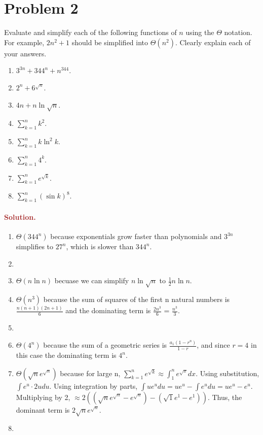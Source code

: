 \section*{Problem 2}
Evaluate and simplify each of the following functions of $n$ using the $\Theta$ notation. For example, $2n^2 + 1$ should be simplified into $\Theta(n^2)$. Clearly explain each of your answers.
\begin{enumerate}
    \item $3^{3n} + 344^n + n^{344}$.
    \item $2^{n} + 6^{\sqrt{n}}$.
    \item $4n + n \ln \sqrt{n}$.
    \item $\sum_{k = 1}^{n} k^2$.
    \item $\sum_{k = 1}^{n} k \ln^2 k$.
    \item $\sum_{k = 1}^{n} 4^k$.
    \item $\sum_{k = 1}^{n} e^{\sqrt{k}}$.
    \item $\sum_{k = 1}^{n} (\sin k)^8$.
\end{enumerate}

\paragraph{\textcolor{brown}{Solution.}}
\begin{enumerate}
    \item $\Theta(344^n)$ because exponentials grow faster than polynomials and $3^{3n}$ simplifies to $27^n$, which is slower than $344^n$.
    \item 
    \item $\Theta(n \ln n)$ becuase we can simplify $n \ln \sqrt{n}$ to $\frac{1}{2} n \ln n$.
    \item $\Theta(n^3)$ because the sum of squares of the first n natural numbers is $\frac{n(n+1)(2n+1)}{6}$ and the dominating term is $\frac{2n^3}{6}$ = $\frac{n^3}{3}$.
    \item
    \item $\Theta(4^n)$ because the sum of a geometric series is $\frac{a_1(1-r^n)}{1-r}$, and since $r = 4$ in this case the dominating term is $4^n$.
    \item $\Theta(\sqrt{n}e^{\sqrt{n}})$ because for large n, $\sum_{k = 1}^{n} e^{\sqrt{k}} \approx \int_{1}^{n} e^{\sqrt{x}}dx$. Using substitution, $\int e^u \cdot 2u du$. Using integration by parts, $\int ue^u du = ue^u - \int e^u du = ue^u - e^u$. Multiplying by 2, $\approx 2((\sqrt{n}e^{\sqrt{n}} - e^{\sqrt{n}}) - (\sqrt{1}e^1 - e^1))$. Thus, the dominant term is $2\sqrt{n}e^{\sqrt{n}}$. 
    \item 
\end{enumerate}

